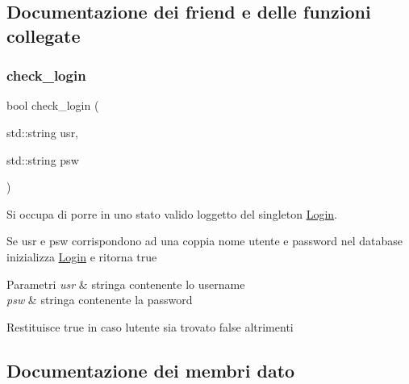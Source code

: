 \subsection{Documentazione dei friend e delle funzioni collegate}
\mbox{\label{structmm_1_1model_1_1authentication_1_1_login_a5023cb987e79151f2a1ed18b9a86a3e8}} 
\subsubsection{\texorpdfstring{check\+\_\+login}{check\_login}}
{\footnotesize\ttfamily bool check\+\_\+login (\begin{DoxyParamCaption}\item[{std\+::string}]{usr,  }\item[{std\+::string}]{psw }\end{DoxyParamCaption})\hspace{0.3cm}{\ttfamily [friend]}}



Si occupa di porre in uno stato valido l\textquotesingle{}oggetto del singleton \mbox{\hyperlink{structmm_1_1model_1_1authentication_1_1_login}{Login}}. 

Se usr e psw corrispondono ad una coppia nome utente e password nel database inizializza \mbox{\hyperlink{structmm_1_1model_1_1authentication_1_1_login}{Login}} e ritorna true


\begin{DoxyParams}{Parametri}
{\em usr} & stringa contenente lo username \\
\hline
{\em psw} & stringa contenente la password \\
\hline
\end{DoxyParams}
\begin{DoxyReturn}{Restituisce}
true in caso l\textquotesingle{}utente sia trovato false altrimenti 
\end{DoxyReturn}


\subsection{Documentazione dei membri dato}
\mbox{\label{structmm_1_1model_1_1authentication_1_1_login_aa74e292b2be0f1e2146576108e74db97}} 
